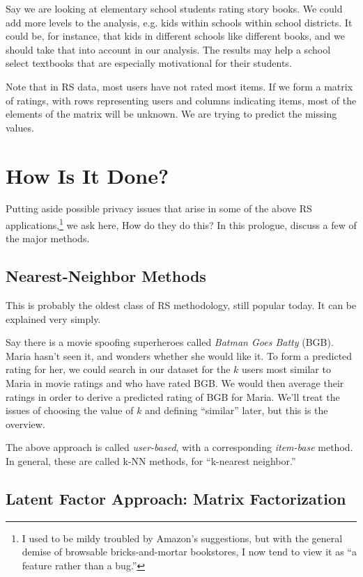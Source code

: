 Say we are looking at elementary school students rating story books.  We
could add more levels to the analysis, e.g. kids within schools within
school districts.  It could be, for instance, that kids in different
schools like different books, and we should take that into account in
our analysis.  The results may help a school select textbooks that are
especially motivational for their students.

Note that in RS data, most users have not rated most items.  If we form
a matrix of ratings, with rows representing users and columns indicating
items, most of the elements of the matrix will be unknown.  We are
trying to predict the missing values.

\section{How Is It Done?}

Putting aside possible privacy issues that arise in some of the above RS
applications,\footnote{I used to be mildy
troubled by Amazon's suggestions, but with the general demise of
browsable bricks-and-mortar bookstores, I now tend to view it as ``a
feature rather than a bug.''} we ask here, How do they do this?  In this
prologue, discuss a few of the major methods.

\subsection{Nearest-Neighbor Methods}

This is probably the oldest class of RS methodology, still popular
today.  It can be explained very simply.

Say there is a movie spoofing superheroes called \textit{Batman Goes
Batty} (BGB).  Maria hasn't seen it, and wonders whether she would like
it.  To form a predicted rating for her, we could search in our dataset
for the $k$ users most similar to Maria in movie ratings and who have
rated BGB.  We would then average their ratings in order to derive a
predicted rating of BGB for Maria.  We'll treat the issues of choosing
the value of $k$ and defining ``similar'' later, but this is the
overview.

The above approach is called \textit{user-based}, with a corresponding
\textit{item-base} method.  In general, these are called k-NN methods,
for ``k-nearest neighbor.''

\subsection{Latent Factor Approach:  Matrix Factorization}


